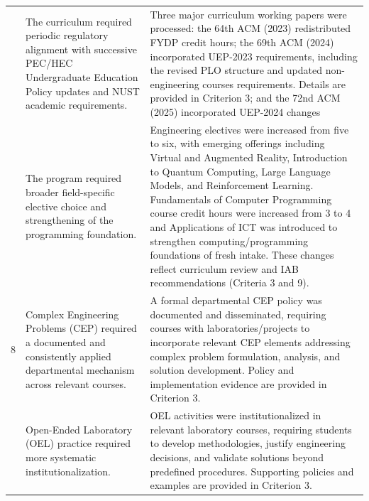 \begin{longtable}{@{}>{\centering\arraybackslash}p{}>{\raggedright\arraybackslash}p{}>{\raggedright\arraybackslash}p{}@{}}
\addlinespace[2pt]
6 & The curriculum required periodic regulatory alignment with successive PEC/HEC Undergraduate Education Policy updates and NUST academic requirements. & Three major curriculum working papers were processed: the 64th ACM (2023) redistributed FYDP credit hours; the 69th ACM (2024) incorporated UEP-2023 requirements, including the revised PLO structure and updated non-engineering courses requirements. Details are provided in Criterion 3; and the 72nd ACM (2025) incorporated UEP-2024 changes\\
\addlinespace[2pt]
7 & The program required broader field-specific elective choice and strengthening of the programming foundation. & Engineering electives were increased from five to six, with emerging offerings including Virtual and Augmented Reality, Introduction to Quantum Computing, Large Language Models, and Reinforcement Learning. Fundamentals of Computer Programming course credit hours were increased from 3 to 4 and Applications of ICT was introduced to strengthen computing/programming foundations of fresh intake. These changes reflect curriculum review and IAB recommendations (Criteria 3 and 9).\\
\addlinespace[2pt]
8 & Complex Engineering Problems (CEP) required a documented and consistently applied departmental mechanism across relevant courses. & A formal departmental CEP policy was documented and disseminated, requiring courses with laboratories/projects to incorporate relevant CEP elements addressing complex problem formulation, analysis, and solution development. Policy and implementation evidence are provided in Criterion 3.\\
\addlinespace[2pt]
9 & Open-Ended Laboratory (OEL) practice required more systematic institutionalization. & OEL activities were institutionalized in relevant laboratory courses, requiring students to develop methodologies, justify engineering decisions, and validate solutions beyond predefined procedures. Supporting policies and examples are provided in Criterion 3.\\

\end{longtable}
